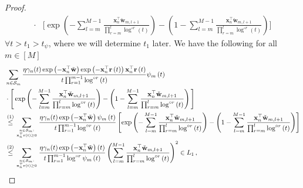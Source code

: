 \documentclass[twoside,11pt,english]{article}
\begin{document}
\begin{proof}
{\begin{align*}
\cdot&\Bigg[
\exp\left(-\sum_{l=m}^{M-1}\frac{\mathbf{x}_{n}^{\top}\check{\mathbf{w}}_{m,l+1}}{\prod_{r=m}^{l}\log^{\circ r}\left(t\right)}\right)-\left(1-\sum_{l=m}^{M-1}\frac{\mathbf{x}_{n}^{\top}\check{\mathbf{w}}_{m,l+1}}{\prod_{r=m}^{l}\log^{\circ r}\left(t\right)}\right)\Bigg]\end{align*}}
$\forall t>t_{1}>t_{\psi}$, where we will determine $t_{1}$ later. We have the following for all $m\in[M]$
{\small
\begin{align}
&\sum_{n\in\set_{m}}\frac{\eta\gamma_n(t)\exp\left(-\mathbf{x}_{n}^{\top}\wtilde\right)\exp\left(-\mathbf{x}_{n}^{\top}\mathbf{r}\left(t\right)\right)\mathbf{x}_{n}^{\top}\mathbf{r}\left(t\right)}{t\prod_{r=1}^{m-1}\log^{\circ r}\left(t\right)}\psi_{m}\left(t\right)\nonumber\\
&\cdot\Bigg[\exp\left(-\sum_{l=m}^{M-1}\frac{\mathbf{x}_{n}^{\top}\check{\mathbf{w}}_{m,l+1}}{\prod_{r=m}^{l}\log^{\circ r}\left(t\right)}\right)\nonumber-\left(1-\sum_{l=m}^{M-1}\frac{\mathbf{x}_{n}^{\top}\check{\mathbf{w}}_{m,l+1}}{\prod_{r=m}^{l}\log^{\circ r}\left(t\right)}\right)\Bigg]\nonumber \\
  &\overset{\left(1\right)}{\leq}  \sum_{n\in\set_{m}: \atop \mathbf{x}_{n}^{\top}\mathbf{r}\left(t\right)\geq0}\frac{\eta\gamma_n(t)\exp\left(-\mathbf{x}_{n}^{\top}\wtilde\right)\psi_{m}\left(t\right)}{t\prod_{r=1}^{m-1}\log^{\circ r}\left(t\right)}\left[\exp\left(-\sum_{l=m}^{M-1}\frac{\mathbf{x}_{n}^{\top}\check{\mathbf{w}}_{m,l+1}}{\prod_{r=m}^{l}\log^{\circ r}\left(t\right)}\right)-\left(1-\sum_{l=m}^{M-1}\frac{\mathbf{x}_{n}^{\top}\check{\mathbf{w}}_{m,l+1}}{\prod_{r=m}^{l}\log^{\circ r}\left(t\right)}\right)\right]\nonumber \\
&\overset{\left(2\right)}{\leq}  \sum_{n\in\set_{m}: \atop \mathbf{x}_{n}^{\top}\mathbf{r}\left(t\right)\geq0}\frac{\eta\gamma_n(t)\exp\left(-\mathbf{x}_{n}^{\top}\wtilde\right)\left(t\right)}{t\prod_{r=1}^{m-1}\log^{\circ r}\psi_m\left(t\right)}\left(\sum_{l=m}^{M-1}\frac{\mathbf{x}_{n}^{\top}\check{\mathbf{w}}_{m,l+1}}{\prod_{r=m}^{l}\log^{\circ r}\left(t\right)}\right)^{2}\in L_1\,,

\end{align}}
\end{proof}
\end{document}
